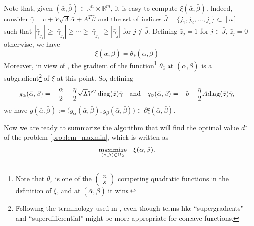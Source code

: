 \documentclass[smallextended,referee,envcountsect]{svjour3}
\newcommand{\R}{\mathbb{R}}
\begin{document}
Note that, given $(\bar\alpha,\bar\beta)\in\R^n\times\R^m$, it is easy to compute 
$\xi(\bar\alpha,\bar\beta)$. Indeed, consider 
$\bar\gamma=c+V\sqrt{\Lambda}\bar\alpha+A^T\bar\beta$ and the set of indices 
$\bar{J}=\{j_1, j_2,\ldots,j_s\}\subset[n]$ such that 
$|\bar\gamma_{j_1}|\geq|\bar\gamma_{j_2}|\geq\cdots
\geq|\bar\gamma_{j_s}|\geq|\bar\gamma_j|$ for $j\notin\bar{J}$. Defining $\bar{z}_j=1$ 
for $j\in\bar{J}$, $\bar{z}_j=0$ otherwise, we have 
\begin{equation}
\label{xi_value}
\xi(\bar\alpha,\bar\beta) = \theta_{\bar{z}}(\bar\alpha,\bar\beta)
\end{equation}
Moreover, in view of \cite[Lemma 3.1.10]{Nesterov04}, the gradient of the 
function\footnote{Note that $\theta_{\bar{z}}$ is one of the 
$\left(\begin{array}{c} n \\ s \end{array}\right)$ competing quadratic functions in the 
definition of $\xi$, and at $(\bar\alpha,\bar\beta)$ it wins.} 
$\theta_{\bar{z}}$ at $(\bar\alpha,\bar\beta)$ is a 
subgradient\footnote{Following the terminology used in \cite{Rockafellar}, 
even though terms like ``supergradients'' and ``superdifferential'' might be more 
appropriate for concave functions.} of $\xi$ at this point. So, defining 
\begin{equation}
\label{subgradient}
g_\alpha(\bar\alpha,\bar\beta)=
-\dfrac{\bar\alpha}{2}-\dfrac{\eta}{2}\sqrt{\Lambda}V^T{\rm diag}(\bar{z})\bar\gamma
\quad\mbox{and}\quad
g_\beta(\bar\alpha,\bar\beta)=
-b-\dfrac{\eta}{2}A{\rm diag}(\bar{z})\bar\gamma,
\end{equation}
we have $g(\bar\alpha,\bar\beta):=
\big(g_\alpha(\bar\alpha,\bar\beta),g_\beta(\bar\alpha,\bar\beta)\big)\in
\partial\xi(\bar\alpha,\bar\beta)$. 

Now we are ready to summarize the algorithm that will find the optimal value 
$d^\star$ of the problem \eqref{problem_maxmin}, which is written as 
\begin{equation}
\label{problem_max_xi}
\begin{array}{cl}
\displaystyle\mathop{\rm maximize}_{(\alpha,\beta)\in\Omega_2} & 
\xi(\alpha,\beta).
\end{array}
\end{equation}
\end{document}
